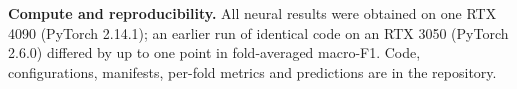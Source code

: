 \documentclass[11pt,a4paper]{article}
\begin{document}
\textbf{Compute and reproducibility.} All neural results were obtained on one RTX 4090 (PyTorch 2.14.1); an earlier run of identical code on an RTX 3050 (PyTorch 2.6.0) differed by up to one point in fold-averaged macro-F1. Code, configurations, manifests, per-fold metrics and predictions are in the repository.



\end{document}
